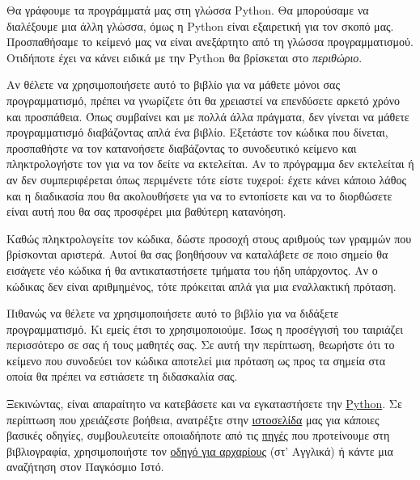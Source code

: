 \documentclass[a4paper,11pt,oneside]{book}
\begin{document}
Θα γράφουμε τα προγράμματά μας στη γλώσσα Python. 
Θα μπορούσαμε να διαλέξουμε μια άλλη γλώσσα, όμως η Python είναι εξαιρετική για τον σκοπό μας.
Προσπαθήσαμε το κείμενό μας να είναι ανεξάρτητο από τη γλώσσα προγραμματισμού. Οτιδήποτε έχει να κάνει ειδικά με την Python θα βρίσκεται στο \emph{περιθώριο}.%

Αν θέλετε να χρησιμοποιήσετε αυτό το βιβλίο για να μάθετε μόνοι σας προγραμματισμό, πρέπει να γνωρίζετε ότι θα χρειαστεί να επενδύσετε αρκετό χρόνο και προσπάθεια. Όπως συμβαίνει και με πολλά άλλα πράγματα, δεν γίνεται να μάθετε προγραμματισμό διαβάζοντας απλά ένα βιβλίο. Εξετάστε τον κώδικα που δίνεται, προσπαθήστε να τον κατανοήσετε διαβάζοντας το συνοδευτικό κείμενο και πληκτρολογήστε τον για να τον δείτε να εκτελείται. Αν το πρόγραμμα δεν εκτελείται ή αν δεν συμπεριφέρεται όπως περιμένετε τότε είστε τυχεροί: έχετε κάνει κάποιο λάθος και η διαδικασία που θα ακολουθήσετε για να το εντοπίσετε και να το διορθώσετε είναι αυτή που θα σας προσφέρει μια βαθύτερη κατανόηση.

Καθώς πληκτρολογείτε τον κώδικα, δώστε προσοχή στους αριθμούς των γραμμών που βρίσκονται αριστερά. Αυτοί θα σας βοηθήσουν να καταλάβετε σε ποιο σημείο θα εισάγετε νέο κώδικα ή θα αντικαταστήσετε τμήματα του ήδη υπάρχοντος. Αν ο κώδικας δεν είναι αριθμημένος, τότε πρόκειται απλά για μια εναλλακτική πρόταση.

Πιθανώς να θέλετε να χρησιμοποιήσετε αυτό το βιβλίο για να διδάξετε προγραμματισμό. Κι εμείς έτσι το χρησιμοποιούμε. Ίσως η προσέγγισή του ταιριάζει περισσότερο σε σας ή τους μαθητές σας. Σε αυτή την περίπτωση, θεωρήστε ότι το κείμενο που συνοδεύει τον κώδικα αποτελεί μια πρόταση ως προς τα σημεία στα οποία θα πρέπει να εστιάσετε τη διδασκαλία σας. 

Ξεκινώντας, είναι απαραίτητο να %
%
κατεβάσετε και να εγκαταστήσετε την \href{https://www.python.org/downloads/}{Python}. %
 Σε περίπτωση που χρειάζεστε βοήθεια, ανατρέξτε στην %
%
\href{http://pythonies.mysch.gr/}{ιστοσελίδα} μας για κάποιες βασικές οδηγίες, συμβουλευτείτε οποιαδήποτε από τις \href{http://users.sch.gr/boukeas/sources/}{πηγές} που προτείνουμε στη βιβλιογραφία, χρησιμοποιήστε τον %
%
\href{https://wiki.python.org/moin/BeginnersGuide}{οδηγό για αρχαρίους} (στ' Αγγλικά) ή κάντε μια αναζήτηση στον Παγκόσμιο Ιστό.
\end{document}

